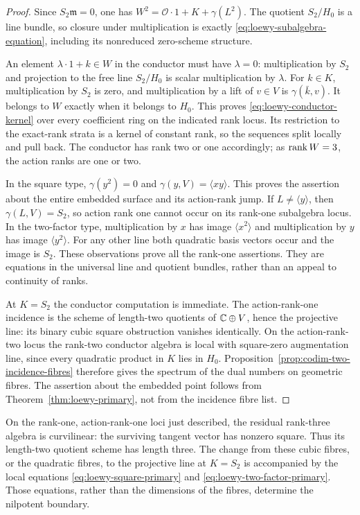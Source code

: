 \begin{proof}
Since $S_2\mathfrak m=0$, one has
$W^2=\mathcal O\cdot1+K+\gamma(L^2)$.
The quotient $S_2/H_0$ is a line bundle, so closure under multiplication
is exactly \eqref{eq:loewy-subalgebra-equation}, including its
nonreduced zero-scheme structure.

An element $\lambda\cdot1+k\in W$ in the conductor must have
$\lambda=0$: multiplication by $S_2$ and projection to the free
line $S_2/H_0$ is scalar multiplication by $\lambda$.
For $k\in K$, multiplication by $S_2$ is zero, and multiplication
by a lift of $v\in V$ is $\gamma(\bar k,v)$.
It belongs to $W$ exactly when it belongs to $H_0$.
This proves \eqref{eq:loewy-conductor-kernel} over every coefficient
ring on the indicated rank locus. Its restriction to the exact-rank
strata is a kernel of constant rank, so the sequences split locally
and pull back. The conductor has rank two or one accordingly;
as $\operatorname{rank} W=3$, the action ranks are one or two.

In the square type, $\gamma(y^2)=0$ and
$\gamma(y,V)=\langle xy\rangle$. This proves the assertion about
the entire embedded surface and its action-rank jump. If $L\ne
\langle y\rangle$, then $\gamma(L,V)=S_2$, so action rank one
cannot occur on its rank-one subalgebra locus.
In the two-factor type, multiplication by $x$ has image
$\langle x^2\rangle$ and multiplication by $y$ has image
$\langle y^2\rangle$. For any other line both quadratic basis
vectors occur and the image is $S_2$. These observations prove all
the rank-one assertions. They are equations in the universal line
and quotient bundles, rather than an appeal to continuity of ranks.

At $K=S_2$ the conductor computation is immediate.
The action-rank-one incidence is the scheme of length-two quotients
of $\mathbb C\oplus V$, hence the projective line: its binary cubic
square obstruction vanishes identically. On the action-rank-two
locus the rank-two conductor algebra is local with square-zero
augmentation line, since every quadratic product in $K$ lies in
$H_0$. Proposition~\ref{prop:codim-two-incidence-fibres} therefore
gives the spectrum of the dual numbers on geometric fibres.
The assertion about the embedded point follows from
Theorem~\ref{thm:loewy-primary}, not from the incidence fibre list.
\end{proof}

On the rank-one, action-rank-one loci just described, the residual
rank-three algebra is curvilinear: the surviving tangent vector has
nonzero square. Thus its length-two quotient scheme has length three.
The change from these cubic fibres, or the quadratic fibres, to the
projective line at $K=S_2$ is accompanied by the local equations
\eqref{eq:loewy-square-primary} and
\eqref{eq:loewy-two-factor-primary}. Those equations, rather than
the dimensions of the fibres, determine the nilpotent boundary.


